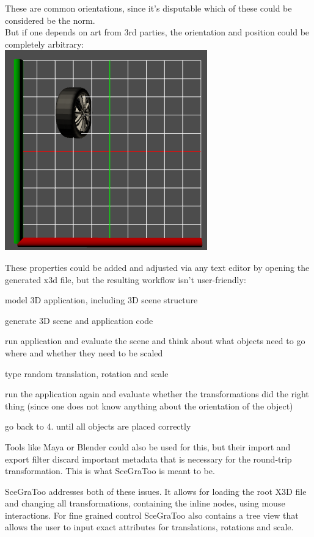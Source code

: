 These are common orientations, since it's disputable which of these
could be considered be the norm.\\
But if one depends on art from 3rd parties, the orientation and position
could be completely arbitrary:\\
\includegraphics{../assets/wheel4.png}

These properties could be added and adjusted via any text editor by
opening the generated x3d file, but the resulting workflow isn't
user-friendly:

\begin{enumerate*}
\def\labelenumi{\arabic{enumi}.}
\item
  model 3D application, including 3D scene structure
\item
  generate 3D scene and application code
\item
  run application and evaluate the scene and think about what objects
  need to go where and whether they need to be scaled
\item
  type random translation, rotation and scale
\item
  run the application again and evaluate whether the transformations did
  the right thing (since one does not know anything about the
  orientation of the object)
\item
  go back to 4. until all objects are placed correctly
\end{enumerate*}

Tools like Maya or Blender could also be used for this, but their import
and export filter discard important metadata that is necessary for the
round-trip transformation. This is what SceGraToo is meant to be.

SceGraToo addresses both of these issues. It allows for loading the root
X3D file and changing all transformations, containing the inline nodes,
using mouse interactions. For fine grained control SceGraToo also
contains a tree view that allows the user to input exact attributes for
translations, rotations and scale.

